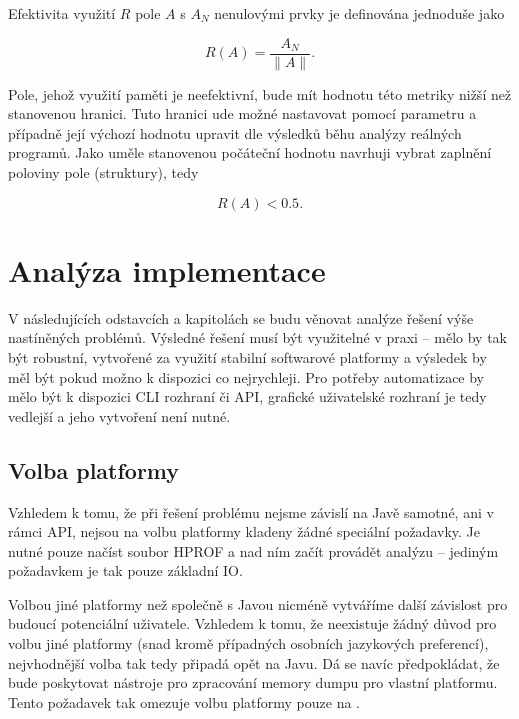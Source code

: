 Efektivita využití $R$ pole $A$ s $A_N$ nenulovými prvky je definována jednoduše jako

\begin{equation}
    R(A) = \frac{A_N}{\|A\|}.
\end{equation}

Pole, jehož využití paměti je neefektivní, bude mít hodnotu této metriky nižší než stanovenou hranici. Tuto hranici ude možné nastavovat pomocí parametru a případně její výchozí hodnotu upravit dle výsledků běhu analýzy reálných programů. Jako uměle stanovenou počáteční hodnotu navrhuji vybrat zaplnění poloviny pole (struktury), tedy

\begin{equation}
    R(A) < 0.5.
\end{equation}

\chapter{Analýza implementace}

V následujících odstavcích a kapitolách se budu věnovat analýze řešení výše nastíněných problémů. Výsledné řešení musí být využitelné v praxi -- mělo by tak být robustní, vytvořené za využití stabilní softwarové platformy a výsledek by měl být pokud možno k dispozici co nejrychleji. Pro potřeby automatizace by mělo být k dispozici CLI rozhraní či API, grafické uživatelské rozhraní je tedy vedlejší a jeho vytvoření není nutné.

\section{Volba platformy}
Vzhledem k tomu, že při řešení problému nejsme závislí na Javě samotné, ani v rámci API, nejsou na volbu platformy kladeny žádné speciální požadavky. Je nutné pouze načíst soubor HPROF a nad ním začít provádět analýzu -- jediným požadavkem je tak pouze základní IO.

Volbou jiné platformy než  společně s Javou nicméně vytváříme další závislost pro budoucí potenciální uživatele. Vzhledem k tomu, že neexistuje žádný důvod pro volbu jiné platformy (snad kromě případných osobních jazykových preferencí), nejvhodnější volba tak tedy připadá opět na Javu. Dá se navíc předpokládat, že bude poskytovat nástroje pro zpracování memory dumpu pro vlastní platformu. Tento požadavek tak omezuje volbu platformy pouze na .

